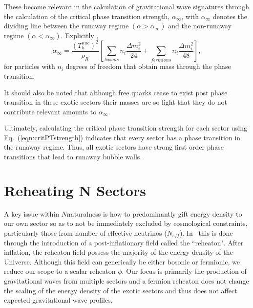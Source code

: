 \documentclass[nofootinbib,twocolumn,preprintnumbers]{revtex4-1}
\begin{document}
These become relevant in the calculation of gravitational wave signatures through the calculation of the critical phase transition strength, $\alpha_{\infty}$, with $\alpha_{\infty}$ denotes the dividing line between the runaway regime  $(\alpha >\alpha_{\infty})$ and the non-runaway regime $(\alpha <\alpha_{\infty})$. Explicitly \cite{Breitbach:2018ddu, Caprini:2015zlo, Espinosa:2010hh}, 
\begin{equation}\label{eqn:critPTstrength}
\alpha_{\infty} = \frac{(T^{nuc}_h)^2}{\rho_R}\left[\sum_{bosons} n_i\frac{\Delta m^2_i}{24} + \sum_{fermions} n_i\frac{\Delta m_i^2}{48}\right],
\end{equation} 
for particles with $n_i$ degrees of freedom that obtain mass through the phase transition. 

It should also be noted that although free quarks cease to exist post phase transition in these exotic sectors their masses are so light that they do not contribute relevant amounts to $\alpha_{\infty}$.

Ultimately, calculating the critical phase transition strength for each sector using Eq.~(\ref{eqn:critPTstrength}) indicates that every sector has a phase transition in the runaway regime. Thus, all exotic sectors have strong first order phase transitions that lead to runaway bubble walls.

\section{Reheating N Sectors}
\label{sec:reheat}


A key issue within $N$naturalness is how to predominantly gift energy density to our own sector so as to not be immediately excluded by cosmological constraints, particularly those from number of effective neutrinos ($N_{eff}$). In~\cite{Arkani-Hamed:2016rle} this is done through the introduction of a post-inflationary field called the ``reheaton". After inflation, the reheaton field possess the majority of the energy density of the Universe. Although this field can generically be either bosonic or fermionic, we reduce our scope to a scalar reheaton $\phi$. Our focus is primarily the production of gravitational waves from multiple sectors and a fermion reheaton does not change the scaling of the energy density of the exotic sectors and thus does not affect expected gravitational wave profiles.
\end{document}
